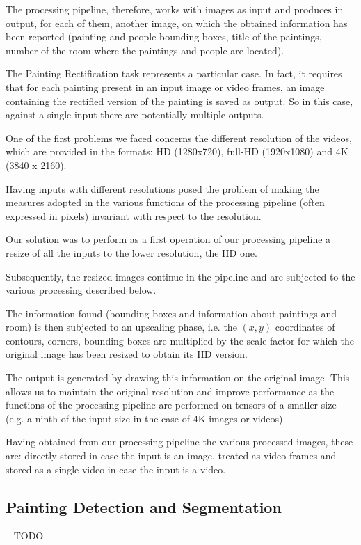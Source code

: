 \documentclass[10pt,twocolumn,letterpaper]{article}
\begin{document}
The processing pipeline, therefore, works with images as input and produces in output, for each of them, another image, on which the obtained information has been reported (painting and people bounding boxes, title of the paintings, number of the room where the paintings and people are located).

The Painting Rectification task represents a particular case. In fact, it requires that for each painting present in an input image or video frames, an image containing the rectified version of the painting is saved as output. So in this case, against a single input there are potentially multiple outputs.

One of the first problems we faced concerns the different resolution of the videos, which are provided in the formats: HD (1280x720), full-HD (1920x1080) and 4K (3840 x 2160).

Having inputs with different resolutions posed the problem of making the measures adopted in the various functions of the processing pipeline (often expressed in pixels) invariant with respect to the resolution.

Our solution was to perform as a first operation of our processing pipeline a resize of all the inputs to the lower resolution, the HD one.

Subsequently, the resized images continue in the pipeline and are subjected to the various processing described below.

The information found (bounding boxes and information about paintings and room) is then subjected to an upscaling phase, i.e. the $(x, y)$ coordinates of contours, corners, bounding boxes are multiplied by the scale factor for which the original image has been resized to obtain its HD version.

The output is generated by drawing this information on the original image. This allows us to maintain the original resolution and improve performance as the functions of the processing pipeline are performed on tensors of a smaller size (e.g. a ninth of the input size in the case of 4K images or videos). 

Having obtained from our processing pipeline the various processed images, these are: directly stored in case the input is an image, treated as video frames and stored as a single video in case the input is a video.

\subsection{Painting Detection and Segmentation}
-- TODO --
\end{document}

